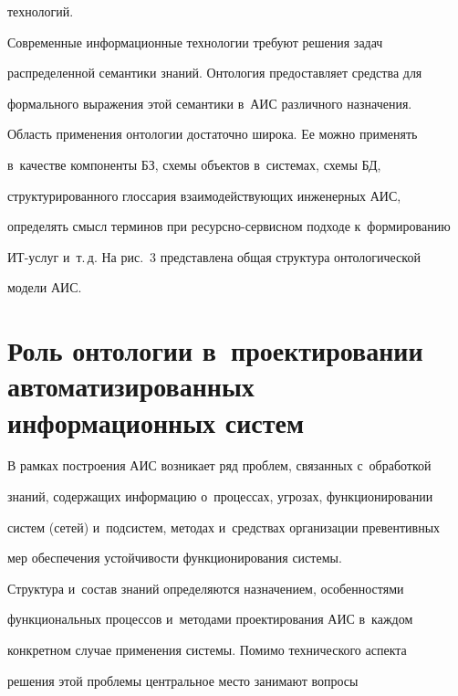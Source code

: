 технологий.


  


  Современные информационные технологии требуют решения задач 


распределенной семантики знаний. Онтология предоставляет средства для 


формального выражения этой семантики в~АИС различного назначения. 


Область применения онтологии достаточно широка. Ее можно применять 


в~качестве компоненты БЗ, схемы объектов в~системах, схемы БД, 


структурированного глоссария взаимодействующих инженерных АИС, 


определять смысл терминов при ре\-сурс\-но-сер\-вис\-ном подходе к~формированию 


ИТ-услуг и~т.\,д. На рис.~3 представлена общая структура онтологической 


модели АИС.


  





  


\section{Роль онтологии в~проектировании автоматизированных информационных систем}





  В рамках построения АИС возникает ряд проблем, связанных с~обработкой 


знаний, содержащих информацию о~процессах, угрозах, функционировании 


систем (сетей) и~подсистем, методах и~средствах организации превентивных 


мер обеспечения устойчивости функционирования системы.


  


  Структура и~состав знаний определяются назначением, особенностями 


функциональных процессов и~методами проектирования АИС в~каждом 


конкретном случае применения системы. Помимо технического аспекта 


решения этой проб\-ле\-мы центральное место занимают вопросы  


